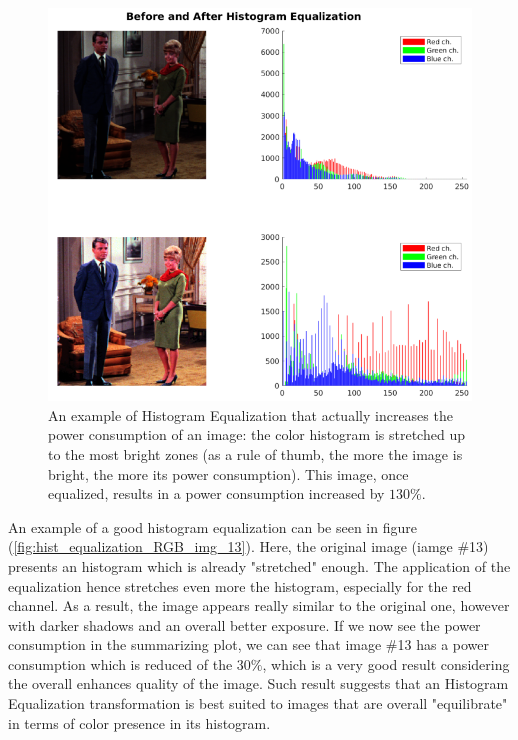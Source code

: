\documentclass[a4paper]{article}
\begin{document}
            \begin{figure}[htp]
                \centering
                \includegraphics[width=0.6 \columnwidth]{./screenshots/hist_equalization_RGB_img_2}
                \caption{
                        \label{fig:hist_equalization_RGB_img_2}
                        An example of Histogram Equalization that actually increases the power consumption of an image: the color histogram is stretched up to the most bright zones (as a rule of thumb, the more the image is bright, the more its power consumption). This image, once equalized, results in a power consumption increased by $130\%$.
                }
            \end{figure}

            An example of a good histogram equalization can be seen in figure (\ref{fig:hist_equalization_RGB_img_13}). Here, the original image (iamge \#13) presents an histogram which is already "stretched" enough. The application of the equalization hence stretches even more the histogram, especially for the red channel. As a result, the image appears really similar to the original one, however with darker shadows and an overall better exposure. If we now see the power consumption in the summarizing plot, we can see that image \#13 has a power consumption which is reduced of the $30\%$, which is a very good result considering the overall enhances quality of the image. Such result suggests that an Histogram Equalization transformation is best suited to images that are overall "equilibrate" in terms of color presence in its histogram.
\end{document}
